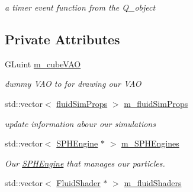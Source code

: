 \begin{DoxyCompactItemize}
\begin{DoxyCompactList}\small\item\em a timer event function from the Q\-\_\-object \end{DoxyCompactList}\end{DoxyCompactItemize}
\subsection*{Private Attributes}
\begin{DoxyCompactItemize}
\item 
\hypertarget{class_open_g_l_widget_a7253ce90a159ebe62b0cdb6de6535d56}{G\-Luint \hyperlink{class_open_g_l_widget_a7253ce90a159ebe62b0cdb6de6535d56}{m\-\_\-cube\-V\-A\-O}}\label{class_open_g_l_widget_a7253ce90a159ebe62b0cdb6de6535d56}

\begin{DoxyCompactList}\small\item\em dummy V\-A\-O to for drawing our V\-A\-O \end{DoxyCompactList}\item 
\hypertarget{class_open_g_l_widget_ae4f415dd70447ddb86bec0630ba86ec6}{std\-::vector$<$ \hyperlink{struct_open_g_l_widget_1_1fluid_sim_props}{fluid\-Sim\-Props} $>$ \hyperlink{class_open_g_l_widget_ae4f415dd70447ddb86bec0630ba86ec6}{m\-\_\-fluid\-Sim\-Props}}\label{class_open_g_l_widget_ae4f415dd70447ddb86bec0630ba86ec6}

\begin{DoxyCompactList}\small\item\em update information abour our simulations \end{DoxyCompactList}\item 
\hypertarget{class_open_g_l_widget_aad4e2f8ee42aca4c11195a1e05d0cab7}{std\-::vector$<$ \hyperlink{class_s_p_h_engine}{S\-P\-H\-Engine} $\ast$ $>$ \hyperlink{class_open_g_l_widget_aad4e2f8ee42aca4c11195a1e05d0cab7}{m\-\_\-\-S\-P\-H\-Engines}}\label{class_open_g_l_widget_aad4e2f8ee42aca4c11195a1e05d0cab7}

\begin{DoxyCompactList}\small\item\em Our \hyperlink{class_s_p_h_engine}{S\-P\-H\-Engine} that manages our particles. \end{DoxyCompactList}\item 
\hypertarget{class_open_g_l_widget_a191b16c3f6cd8f26565c6737f2b2c39e}{std\-::vector$<$ \hyperlink{class_fluid_shader}{Fluid\-Shader} $\ast$ $>$ \hyperlink{class_open_g_l_widget_a191b16c3f6cd8f26565c6737f2b2c39e}{m\-\_\-fluid\-Shaders}}\label{class_open_g_l_widget_a191b16c3f6cd8f26565c6737f2b2c39e}


\end{DoxyCompactItemize}
